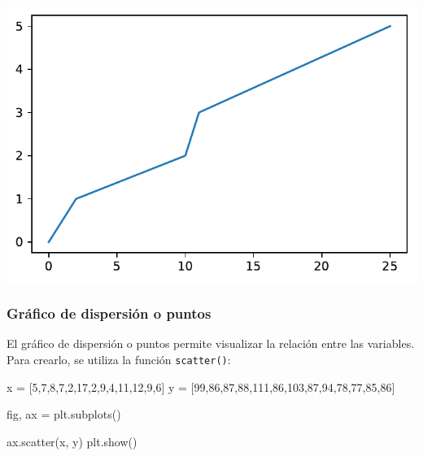 \documentclass[
  letterpaper,
  DIV=11,
  numbers=noendperiod]{scrreprt}
\newenvironment{Shaded}{\begin{snugshade}}{\end{snugshade}}
\newcommand{\DecValTok}[1]{\textcolor[rgb]{0.68,0.00,0.00}{#1}}
\newcommand{\NormalTok}[1]{\textcolor[rgb]{0.00,0.23,0.31}{#1}}
\newcommand{\OperatorTok}[1]{\textcolor[rgb]{0.37,0.37,0.37}{#1}}
\begin{document}
\includegraphics{unidad_6_files/figure-pdf/cell-117-output-1.pdf}

\subsubsection{Gráfico de dispersión o
puntos}\label{gruxe1fico-de-dispersiuxf3n-o-puntos}

El gráfico de dispersión o puntos permite visualizar la relación entre
las variables. Para crearlo, se utiliza la función \texttt{scatter()}:

\begin{Shaded}
\begin{Highlighting}[]
\NormalTok{x }\OperatorTok{=}\NormalTok{ [}\DecValTok{5}\NormalTok{,}\DecValTok{7}\NormalTok{,}\DecValTok{8}\NormalTok{,}\DecValTok{7}\NormalTok{,}\DecValTok{2}\NormalTok{,}\DecValTok{17}\NormalTok{,}\DecValTok{2}\NormalTok{,}\DecValTok{9}\NormalTok{,}\DecValTok{4}\NormalTok{,}\DecValTok{11}\NormalTok{,}\DecValTok{12}\NormalTok{,}\DecValTok{9}\NormalTok{,}\DecValTok{6}\NormalTok{]}
\NormalTok{y }\OperatorTok{=}\NormalTok{ [}\DecValTok{99}\NormalTok{,}\DecValTok{86}\NormalTok{,}\DecValTok{87}\NormalTok{,}\DecValTok{88}\NormalTok{,}\DecValTok{111}\NormalTok{,}\DecValTok{86}\NormalTok{,}\DecValTok{103}\NormalTok{,}\DecValTok{87}\NormalTok{,}\DecValTok{94}\NormalTok{,}\DecValTok{78}\NormalTok{,}\DecValTok{77}\NormalTok{,}\DecValTok{85}\NormalTok{,}\DecValTok{86}\NormalTok{]}

\NormalTok{fig, ax }\OperatorTok{=}\NormalTok{ plt.subplots()}

\NormalTok{ax.scatter(x, y)}
\NormalTok{plt.show()}
\end{Highlighting}
\end{Shaded}
\end{document}
